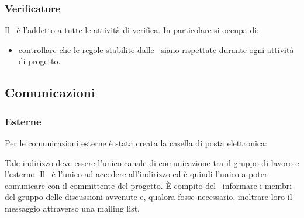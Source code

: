 \documentclass[../NormeDiProgetto.tex]{subfiles}
\begin{document}
			\subsubsection{Verificatore}
				Il \verificatore\ è l'addetto a tutte le attività di verifica.
				In particolare si occupa di:
				\begin{itemize}
					\item controllare che le regole stabilite dalle \normediprogetto\ siano rispettate durante ogni attività di progetto.
				\end{itemize}
		\subsection{Comunicazioni}
			\subsubsection{Esterne}
				Per le comunicazioni esterne è stata creata la casella di posta
				elettronica:
				\begin{center}
					\mailkaleidoscode
				\end{center}
				Tale indirizzo deve essere l'unico canale di comunicazione tra il
				gruppo di lavoro e l'esterno.
				Il \responsabilediprogetto\ è l'unico ad accedere
				all'indirizzo ed è quindi l'unico a poter comunicare con il
				committente del progetto. È compito del \responsabilediprogetto\ informare
				i membri del gruppo delle discussioni avvenute e,
				qualora fosse necessario, inoltrare loro il messaggio attraverso
				una mailing list.
\end{document}
